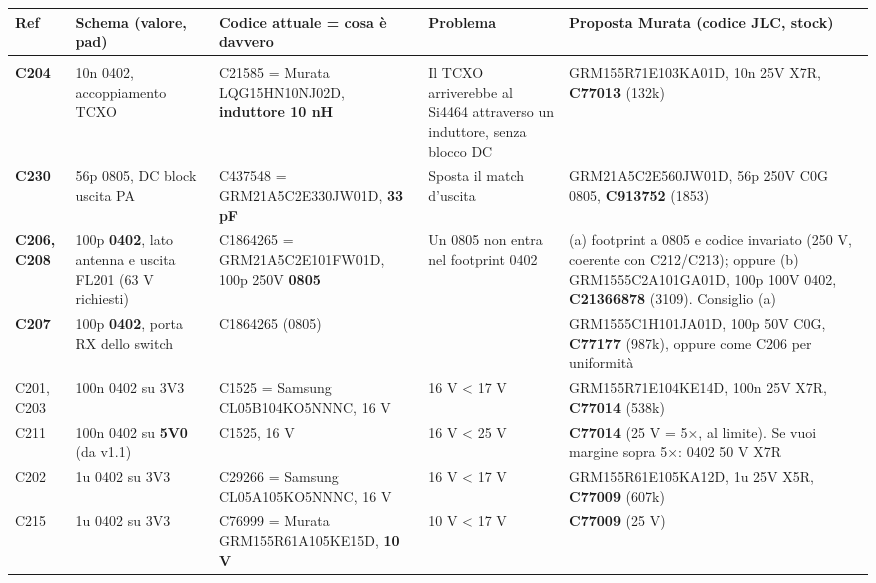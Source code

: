 {\footnotesize{}\setlength{\tabcolsep}{4pt}\renewcommand{\arraystretch}{1.1}
\begin{xltabular}{\linewidth}{>{\hsize\raggedright\arraybackslash}X>{\hsize\raggedright\arraybackslash}X>{\hsize\raggedright\arraybackslash}X>{\hsize\raggedright\arraybackslash}X>{\hsize\raggedright\arraybackslash}X}
\toprule
\textbf{Ref} & \textbf{Schema (valore, pad)} & \textbf{Codice attuale = cosa è davvero} & \textbf{Problema} & \textbf{Proposta Murata (codice JLC, stock)} \\
\midrule
\endhead
\midrule[0.15pt]\\\bottomrule\endfoot
\bottomrule\endlastfoot
\textbf{C204} & 10n 0402, accoppiamento TCXO & C21585 = Murata LQG15HN10NJ02D, \textbf{induttore 10 nH} &  Il TCXO arriverebbe al Si4464 attraverso un induttore, senza blocco DC & GRM155R71E103KA01D, 10n 25V X7R, \textbf{C77013} (132k) \\\midrule[0.15pt]
\textbf{C230} & 56p 0805, DC block uscita PA & C437548 = GRM21A5C2E330JW01D, \textbf{33 pF} &  Sposta il match d'uscita & GRM21A5C2E560JW01D, 56p 250V C0G 0805, \textbf{C913752} (1853) \\\midrule[0.15pt]
\textbf{C206, C208} & 100p \textbf{0402}, lato antenna e uscita FL201 (63 V richiesti) & C1864265 = GRM21A5C2E101FW01D, 100p 250V \textbf{0805} &  Un 0805 non entra nel footprint 0402 & (a) footprint a 0805 e codice invariato (250 V, coerente con C212/\allowbreak{}C213); oppure (b) GRM1555C2A101GA01D, 100p 100V 0402, \textbf{C21366878} (3109). Consiglio (a) \\\midrule[0.15pt]
\textbf{C207} & 100p \textbf{0402}, porta RX dello switch & C1864265 (0805) &  & GRM1555C1H101JA01D, 100p 50V C0G, \textbf{C77177} (987k), oppure come C206 per uniformità \\\midrule[0.15pt]
C201, C203 & 100n 0402 su 3V3 & C1525 = Samsung CL05B104KO5NNNC, 16 V &  16 V < 17 V & GRM155R71E104KE14D, 100n 25V X7R, \textbf{C77014} (538k) \\\midrule[0.15pt]
C211 & 100n 0402 su \textbf{5V0} (da v1.1) & C1525, 16 V &  16 V < 25 V & \textbf{C77014} (25 V = 5×, al limite). Se vuoi margine sopra 5×: 0402 50 V X7R \\\midrule[0.15pt]
C202 & 1u 0402 su 3V3 & C29266 = Samsung CL05A105KO5NNNC, 16 V &  16 V < 17 V & GRM155R61E105KA12D, 1u 25V X5R, \textbf{C77009} (607k) \\\midrule[0.15pt]
C215 & 1u 0402 su 3V3 & C76999 = Murata GRM155R61A105KE15D, \textbf{10 V} &  10 V < 17 V & \textbf{C77009} (25 V) \\
\end{xltabular}}

